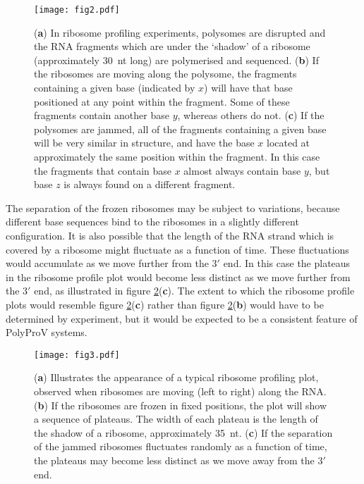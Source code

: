 \documentclass[12pt]{iopart}
\begin{document}
\begin{figure}
\begin{center}
\texttt{[image: fig2.pdf]}
\caption{\label{fig: 2}
({\bf a}) In ribosome profiling experiments, polysomes are disrupted and the RNA fragments which are under 
the \lq shadow' of a ribosome (approximately 30~nt long) are polymerised and sequenced. 
({\bf b}) If the ribosomes are moving along the polysome, the fragments containing a given base 
(indicated by $x$) will have that base positioned at any point within the fragment. Some of these fragments 
contain another base $y$, whereas others do not.
({\bf c}) If the polysomes are jammed, all of the fragments containing a given base will be very similar in structure, and 
have the base $x$ located at approximately the same position within the fragment. In this case the fragments that 
contain base $x$ almost always contain base $y$, but base $z$ is always found on a different fragment.
}
\end{center}
\end{figure}

The separation of the frozen ribosomes may be subject to variations, because different base 
sequences bind to the ribosomes in a slightly different configuration. It is also possible that 
the length of the RNA strand which is covered by a ribosome might fluctuate as a 
function of time. These fluctuations would accumulate as we move further from the $3'$ end. 
In this case the plateaus in the ribosome profile plot would become less distinct as we move 
further from the $3'$ end, as illustrated in figure \ref{fig: 3}({\bf c}). 
The extent to which the ribosome profile plots would resemble 
figure \ref{fig: 3}({\bf c}) rather than figure \ref{fig: 3}({\bf b}) 
would have to be determined by experiment, but it would be expected to be a consistent feature 
of PolyProV systems.

\begin{figure}
\begin{center}
\texttt{[image: fig3.pdf]}
\caption{\label{fig: 3}
({\bf a}) Illustrates the appearance of a typical ribosome profiling plot, observed when ribosomes 
are moving (left to right) along the RNA. ({\bf b}) If the ribosomes are frozen in fixed positions, the plot will 
show a sequence of plateaus. The width of each plateau is the length of the shadow of a ribosome, 
approximately 35~nt. ({\bf c}) If the separation of the jammed ribosomes fluctuates randomly as a function of time, 
the plateaus may become less distinct as we move away from the $3'$ end. 
}
\end{center}
\end{figure}
\end{document}
